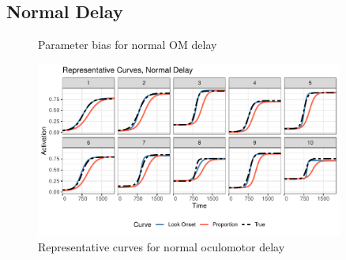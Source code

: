 \documentclass{article}
\begin{document}
\subsection{Normal Delay}

\begin{figure}[H]
\centering
\caption{Parameter bias for normal OM delay}
\label{fig:par_bias_normal_delay}
\end{figure}

\begin{figure}[H]
\centering
\includegraphics[width=0.9\textwidth]{rep_curves_normal_delay.pdf}
\caption{Representative curves for normal oculomotor delay}
\label{fig:rep_curves_normal_delay}
\end{figure}
\end{document}

